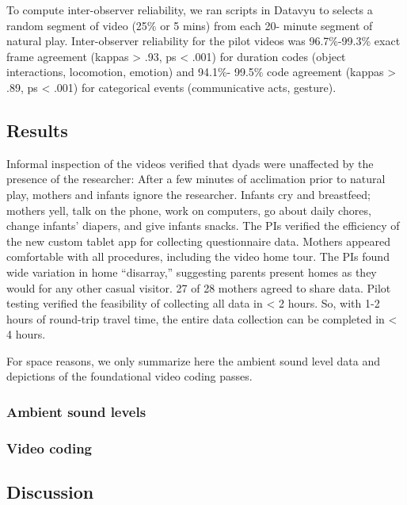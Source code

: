 \documentclass[english,man]{apa6}
\theoremstyle{definition}
\theoremstyle{definition}
\theoremstyle{definition}
\theoremstyle{remark}
\begin{document}
To compute inter-observer reliability, we ran scripts in Datavyu to
selects a random segment of video (25\% or 5 mins) from each 20- minute
segment of natural play. Inter-observer reliability for the pilot videos
was 96.7\%-99.3\% exact frame agreement (kappas \textgreater{} .93, ps
\textless{} .001) for duration codes (object interactions, locomotion,
emotion) and 94.1\%- 99.5\% code agreement (kappas \textgreater{} .89,
ps \textless{} .001) for categorical events (communicative acts,
gesture).

\subsection{Results}\label{results}

Informal inspection of the videos verified that dyads were unaffected by
the presence of the researcher: After a few minutes of acclimation prior
to natural play, mothers and infants ignore the researcher. Infants cry
and breastfeed; mothers yell, talk on the phone, work on computers, go
about daily chores, change infants' diapers, and give infants snacks.
The PIs verified the efficiency of the new custom tablet app for
collecting questionnaire data. Mothers appeared comfortable with all
procedures, including the video home tour. The PIs found wide variation
in home \enquote{disarray,} suggesting parents present homes as they
would for any other casual visitor. 27 of 28 mothers agreed to share
data. Pilot testing verified the feasibility of collecting all data in
\textless{} 2 hours. So, with 1-2 hours of round-trip travel time, the
entire data collection can be completed in \textless{} 4 hours.

For space reasons, we only summarize here the ambient sound level data
and depictions of the foundational video coding passes.

\subsubsection{Ambient sound levels}\label{ambient-sound-levels}

\subsubsection{Video coding}\label{video-coding}

\subsection{Discussion}\label{discussion}
\end{document}
